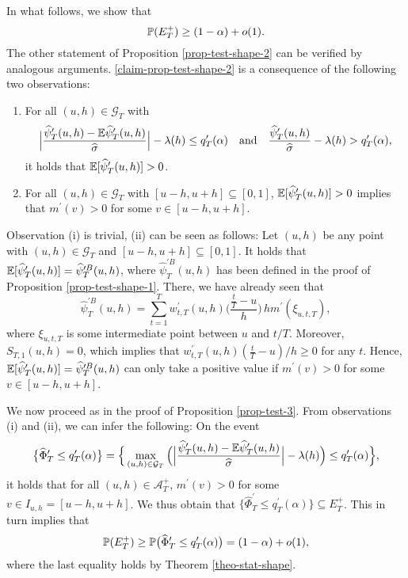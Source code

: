 \documentclass[a4paper,12pt]{article}
\begin{document}
In what follows, we show that 
\begin{equation}\label{claim-prop-test-shape-2}
\mathbb{P}(E_T^+) \ge (1-\alpha) + o(1). 
\end{equation}
The other statement of Proposition \ref{prop-test-shape-2} can be verified by analogous arguments. \eqref{claim-prop-test-shape-2} is a consequence of the following two observations:  
\begin{enumerate}[label=(\roman*),leftmargin=0.75cm]

\item For all $(u,h) \in \mathcal{G}_T$ with   
\[ \Big|\frac{\widehat{\psi}_T^\prime(u,h) - \mathbb{E} \widehat{\psi}_T^\prime(u,h)}{\widehat{\sigma}}\Big| - \lambda(h) \le q_T^\prime(\alpha) \quad \text{and} \quad \frac{\widehat{\psi}_T^\prime(u,h)}{\widehat{\sigma}} - \lambda(h) > q_T^\prime(\alpha), \]
it holds that $\mathbb{E}[\widehat{\psi}_T^\prime(u,h)] > 0$. 

\item For all $(u,h) \in \mathcal{G}_T$ with $[u-h,u+h] \subseteq [0,1]$,  $\mathbb{E}[\widehat{\psi}_T^\prime(u,h)] > 0$ implies that $m^\prime(v) > 0$ for some $v \in [u-h,u+h]$. 

\end{enumerate}
Observation (i) is trivial, (ii) can be seen as follows: Let $(u,h)$ be any point with $(u,h) \in \mathcal{G}_T$ and $[u-h,u+h] \subseteq [0,1]$. It holds that $\mathbb{E}[\widehat{\psi}_T^\prime(u,h)] = \widehat{\psi}_T^{\prime B}(u,h)$, where $\widehat{\psi}_T^{\prime B}(u,h)$ has been defined in the proof of Proposition \ref{prop-test-shape-1}. There, we have already seen that  
\[ \widehat{\psi}_T^{\prime B}(u,h) = \sum\limits_{t=1}^T w_{t,T}^\prime(u,h) \Big( \frac{\frac{t}{T} - u}{h} \Big) \, h m^\prime(\xi_{u,t,T}), \]
where $\xi_{u,t,T}$ is some intermediate point between $u$ and $t/T$. Moreover, $S_{T,1}(u,h) = 0$, which implies that $w_{t,T}^\prime(u,h) (\frac{t}{T} - u)/h \ge 0$ for any $t$. Hence, $\mathbb{E}[\widehat{\psi}_T^\prime(u,h)] = \widehat{\psi}_T^{\prime B}(u,h)$ can only take a positive value if $m^\prime(v) > 0$ for some $v \in [u-h,u+h]$. 


We now proceed as in the proof of Proposition \ref{prop-test-3}. From observations (i) and (ii), we can infer the following: On the event 
\[ \big\{ \widehat{\Phi}_T^\prime \le q_T^\prime(\alpha) \big\} = \Big\{ \max_{(u,h) \in \mathcal{G}_T} \Big( \Big|\frac{\widehat{\psi}_T^\prime(u,h) - \mathbb{E} \widehat{\psi}_T^\prime(u,h)}{\widehat{\sigma}}\Big| - \lambda(h) \Big) \le q_T^\prime(\alpha) \Big\}, \]
it holds that for all $(u,h) \in \mathcal{A}_T^+$, $m^\prime(v) > 0$ for some $v \in I_{u,h} = [u-h,u+h]$. We thus obtain that $\{ \widehat{\Phi}_T^\prime \le q_T^\prime(\alpha) \} \subseteq E_T^+$. This in turn implies that 
\[ \mathbb{P}(E_T^+) \ge \mathbb{P} \big(  \widehat{\Phi}_T^\prime \le q_T^\prime(\alpha) \big) = (1-\alpha) + o(1), \]
where the last equality holds by Theorem \ref{theo-stat-shape}. 
\end{document}
